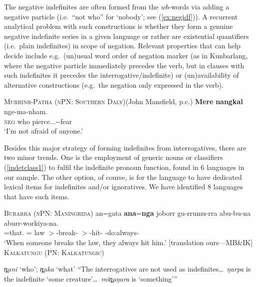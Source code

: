 \documentclass[12pt,egregdoesnotlikesansseriftitles]{scrartcl}
\begin{document}
The negative indefinites are often formed from the \textit{wh}-words via adding a negative particle (i.e.\ ``not who'' for `nobody'; see (\ref{ex:negidf})). A recurrent analytical problem with such constructions is whether they form a genuine negative indefinite series in a given language or rather are existential quantifiers (i.e.\ plain indefinites) in scope of negation. %
Relevant properties that can help decide include e.g.\ (un)usual word order of negation marker (as in Kunbarlang, where the negative particle immediately precedes the verb, but in clauses with such indefinites it precedes the interrogative/indefinite) or (un)availability of alternative constructions (e.g.\ the negation only expressed in the verb).
\begin{exe}
  \ex\label{ex:negidf} \textsc{Murrinh-Patha (nPN: Southern Daly)}\hfill (John Mansfield, p.c.)
  \gll \textbf{Mere} \textbf{nangkal} nge-ma-nham.\\
  \textsc{neg} who pierce.\Rr.\Fsg.\Irr-\Appl-fear\\
  \glt `I'm not afraid of anyone.' %
\end{exe}

Besides this major strategy of forming indefinites from interrogatives, there are two minor trends. One is the employment of generic nouns or classifiers (\ref{indetclass1}) to fulfil the indefinite pronoun function, found in 6 languages in our sample. The other option, of course, is for the language to have dedicated lexical items for indefinites and/or ignoratives. We have identified 8 languages that have such items.
\begin{exe}
  \ex\label{indetclass1} \textsc{Burarra (nPN: Maningrida)}\hfill {}
  \gll an=gata    \textbf{ana}=\textbf{nga}            joborr    gu-rrumu-rra  abu-bu-na            aburr-workiya-na.\\
  \Third\Min=that.\Rcgn{}   \Third\Min\Hum=\Indet{}   law     \Third\Min$>$\Third\Min-break-\Pc{}  \Third\Aug$>$\Third\Min-hit-\Pc{}    \Third\Aug-do:always-\Pc\\
  \glt %
  `When someone breaks the law, they always hit him.' [translation ours---MB\&IK]
  \ex \textsc{Kalkatungu (PN: Kalkatungic)}\hfill {}
  \begin{xlist}
    \ex \textit{\charis n̪ani} `who'; \textit{\charis n̪aka} `what'
    \ex ``The interrogatives are not used as indefinites\ldots\ \textit{\charis ŋarpa} is the indefinite `some creature'\ldots\ \textit{\charis min̪aŋara} is `something'\thinspace''
  \end{xlist}
\end{exe}
\end{document}
